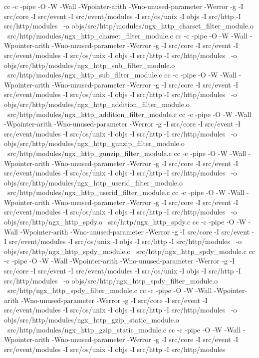 cc -c -pipe  -O -W -Wall -Wpointer-arith -Wno-unused-parameter -Werror -g  -I src/core -I src/event -I src/event/modules -I src/os/unix -I objs -I src/http -I src/http/modules \
	-o objs/src/http/modules/ngx_http_charset_filter_module.o \
	src/http/modules/ngx_http_charset_filter_module.c
cc -c -pipe  -O -W -Wall -Wpointer-arith -Wno-unused-parameter -Werror -g  -I src/core -I src/event -I src/event/modules -I src/os/unix -I objs -I src/http -I src/http/modules \
	-o objs/src/http/modules/ngx_http_sub_filter_module.o \
	src/http/modules/ngx_http_sub_filter_module.c
cc -c -pipe  -O -W -Wall -Wpointer-arith -Wno-unused-parameter -Werror -g  -I src/core -I src/event -I src/event/modules -I src/os/unix -I objs -I src/http -I src/http/modules \
	-o objs/src/http/modules/ngx_http_addition_filter_module.o \
	src/http/modules/ngx_http_addition_filter_module.c
cc -c -pipe  -O -W -Wall -Wpointer-arith -Wno-unused-parameter -Werror -g  -I src/core -I src/event -I src/event/modules -I src/os/unix -I objs -I src/http -I src/http/modules \
	-o objs/src/http/modules/ngx_http_gunzip_filter_module.o \
	src/http/modules/ngx_http_gunzip_filter_module.c
cc -c -pipe  -O -W -Wall -Wpointer-arith -Wno-unused-parameter -Werror -g  -I src/core -I src/event -I src/event/modules -I src/os/unix -I objs -I src/http -I src/http/modules \
	-o objs/src/http/modules/ngx_http_userid_filter_module.o \
	src/http/modules/ngx_http_userid_filter_module.c
cc -c -pipe  -O -W -Wall -Wpointer-arith -Wno-unused-parameter -Werror -g  -I src/core -I src/event -I src/event/modules -I src/os/unix -I objs -I src/http -I src/http/modules \
	-o objs/src/http/ngx_http_spdy.o \
	src/http/ngx_http_spdy.c
cc -c -pipe  -O -W -Wall -Wpointer-arith -Wno-unused-parameter -Werror -g  -I src/core -I src/event -I src/event/modules -I src/os/unix -I objs -I src/http -I src/http/modules \
	-o objs/src/http/ngx_http_spdy_module.o \
	src/http/ngx_http_spdy_module.c
cc -c -pipe  -O -W -Wall -Wpointer-arith -Wno-unused-parameter -Werror -g  -I src/core -I src/event -I src/event/modules -I src/os/unix -I objs -I src/http -I src/http/modules \
	-o objs/src/http/ngx_http_spdy_filter_module.o \
	src/http/ngx_http_spdy_filter_module.c
cc -c -pipe  -O -W -Wall -Wpointer-arith -Wno-unused-parameter -Werror -g  -I src/core -I src/event -I src/event/modules -I src/os/unix -I objs -I src/http -I src/http/modules \
	-o objs/src/http/modules/ngx_http_gzip_static_module.o \
	src/http/modules/ngx_http_gzip_static_module.c
cc -c -pipe  -O -W -Wall -Wpointer-arith -Wno-unused-parameter -Werror -g  -I src/core -I src/event -I src/event/modules -I src/os/unix -I objs -I src/http -I src/http/modules \
